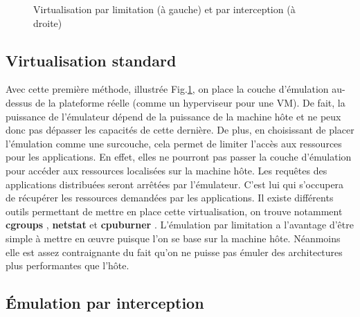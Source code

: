 \begin{figure}[H]
\begin{subfigure}{0.3\textwidth}
  \end{subfigure}
  \caption{Virtualisation par limitation (à gauche) et par interception (à
    droite)}
  \label{TYPE_VIRTUALISATION}
\end{figure}

\subsection{Virtualisation standard}
\label{section:limitation}

Avec cette première méthode, illustrée Fig.\ref{TYPE_VIRTUALISATION}, on place la couche d'émulation au-dessus de la
plateforme réelle (comme un hyperviseur pour une VM). De fait, la puissance de
l'émulateur dépend de la puissance de la machine hôte et ne peux donc pas
dépasser les capacités de cette dernière. De plus, en choisissant de placer
l'émulation comme une surcouche, cela permet de limiter l'accès aux ressources
pour les applications. En effet, elles ne pourront pas passer la couche
d'émulation pour accéder aux ressources localisées sur la machine hôte. Les
requêtes des applications distribuées seront arrêtées par l'émulateur. C'est lui
qui s'occupera de récupérer les ressources demandées par les applications. Il
existe différents outils permettant de mettre en place cette virtualisation, on
trouve notamment \textbf{cgroups} \citep{cgroups}, \textbf{netstat} et \textbf{cpuburner} \citep{canon2006wrekavoc, buchert2011methods}. L'émulation par limitation a l'avantage d'être simple à mettre en \oe uvre puisque
l'on se base sur la machine hôte. Néanmoins elle est assez contraignante du fait
qu'on ne puisse pas émuler des architectures plus performantes que l'hôte.

\subsection{Émulation par interception}
\label{section:interception}

